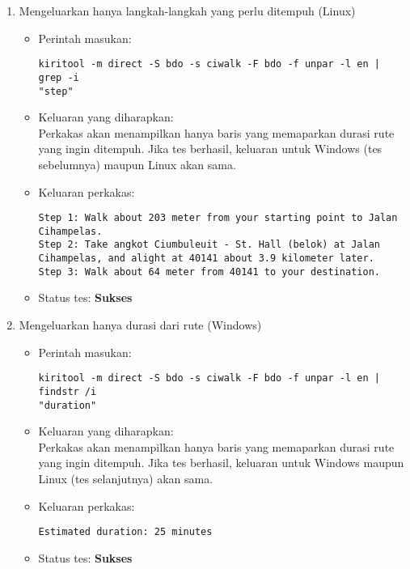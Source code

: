 \begin{enumerate}
	\item Mengeluarkan hanya langkah-langkah yang perlu ditempuh (Linux)
	\begin{itemize}
		\item Perintah masukan:
		\begin{verbatim}
kiritool -m direct -S bdo -s ciwalk -F bdo -f unpar -l en | grep -i
"step"
		\end{verbatim}
		\item Keluaran yang diharapkan: \\
		Perkakas akan menampilkan hanya baris yang memaparkan durasi rute yang ingin ditempuh. Jika tes berhasil, keluaran untuk Windows (tes sebelumnya) maupun Linux akan sama.
		\item Keluaran perkakas:
		\begin{lstlisting}
Step 1: Walk about 203 meter from your starting point to Jalan Cihampelas.
Step 2: Take angkot Ciumbuleuit - St. Hall (belok) at Jalan Cihampelas, and alight at 40141 about 3.9 kilometer later.
Step 3: Walk about 64 meter from 40141 to your destination.
		\end{lstlisting}
		\item Status tes: \textbf{Sukses}
	\end{itemize}
	
	\item Mengeluarkan hanya durasi dari rute (Windows)
	\begin{itemize}
		\item Perintah masukan:
		\begin{verbatim}
kiritool -m direct -S bdo -s ciwalk -F bdo -f unpar -l en | findstr /i
"duration"
		\end{verbatim}
		\item Keluaran yang diharapkan: \\
		Perkakas akan menampilkan hanya baris yang memaparkan durasi rute yang ingin ditempuh. Jika tes berhasil, keluaran untuk Windows maupun Linux (tes selanjutnya) akan sama.
		\item Keluaran perkakas:
		\begin{lstlisting}
Estimated duration: 25 minutes
		\end{lstlisting}
		\item Status tes: \textbf{Sukses}
	\end{itemize}
	

\end{enumerate}
